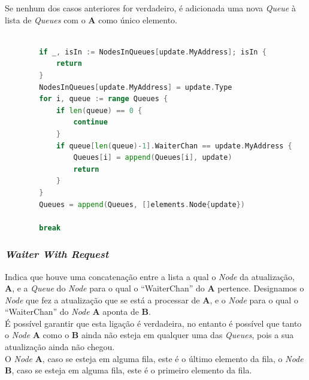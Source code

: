 Se nenhum dos casos anteriores for verdadeiro, é adicionada uma nova \emph{Queue} à lista de \emph{Queues} com o \textbf{A} como único elemento.
\begin{lstlisting}[caption={Alterações nas filas caso o \emph{Node} seja do tipo ``Waiter Terminal''},language=Go]

		if _, isIn := NodesInQueues[update.MyAddress]; isIn {
			return
		}
		NodesInQueues[update.MyAddress] = update.Type
		for i, queue := range Queues {
			if len(queue) == 0 {
				continue
			}
			if queue[len(queue)-1].WaiterChan == update.MyAddress {
				Queues[i] = append(Queues[i], update)
				return
			}
		}
		Queues = append(Queues, []elements.Node{update})

		break

\end{lstlisting}


\subsubsection{ \emph{Waiter With Request} }
Indica que houve uma concatenação entre a lista a qual o \emph{Node} da atualização, \textbf{A}, e a \emph{Queue} do \emph{Node} para o qual o ``WaiterChan'' do \textbf{A} pertence. 
Designamos o \emph{Node} que fez a atualização que se está a processar de \textbf{A}, e o \emph{Node} para o qual o ``WaiterChan'' do \emph{Node} \textbf{A} aponta de \textbf{B}.\\

É possível garantir que esta ligação é verdadeira, no entanto é possível que tanto o \emph{Node} \textbf{A} como o \textbf{B} ainda não esteja em qualquer uma das \emph{Queues}, pois a sua atualização ainda não chegou.\\

O \emph{Node} \textbf{A}, caso se esteja em alguma fila, este é o último elemento da fila,
o \emph{Node} \textbf{B}, caso se esteja em alguma fila, este é o primeiro elemento da fila.\\

